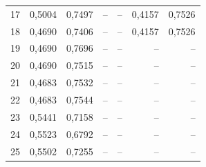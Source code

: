 \begin{table}[htbp]
\begin{tabular}{rrrrrrr}
17 & 0,5004 & 0,7497 & -- & -- & 0,4157 & 0,7526 \\
18 & 0,4690 & 0,7406 & -- & -- & 0,4157 & 0,7526 \\
19 & 0,4690 & 0,7696 & -- & -- & -- & -- \\
20 & 0,4690 & 0,7515 & -- & -- & -- & -- \\
21 & 0,4683 & 0,7532 & -- & -- & -- & -- \\
22 & 0,4683 & 0,7544 & -- & -- & -- & -- \\
23 & 0,5441 & 0,7158 & -- & -- & -- & -- \\
24 & 0,5523 & 0,6792 & -- & -- & -- & -- \\
25 & 0,5502 & 0,7255 & -- & -- & -- & -- \\
\bottomrule
\end{tabular}
\end{table}

\clearpage
